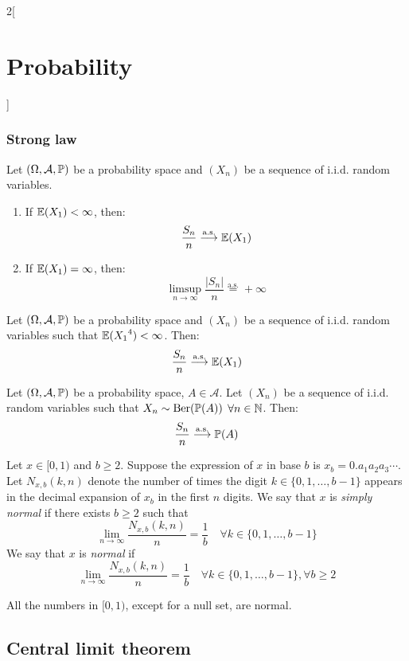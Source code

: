 \documentclass[../../../main.tex]{subfiles}
\begin{document}
\begin{multicols}{2}[\section{Probability}]
    \subsubsection{Strong law}
    \begin{theorem}
        Let $(\Omega,\mathcal{A},\mathbb{P})$ be a probability space and $(X_n)$ be a sequence of i.i.d. random variables.
        \begin{enumerate}
            \item If $\mathbb{E}(X_1)<\infty$, then: $$\frac{S_n}{n}\overset{\text{a.s.}}{\longrightarrow}\mathbb{E}(X_1)$$
            \item If $\mathbb{E}(X_1)=\infty$, then: $$\limsup_{n\to\infty}\frac{|S_n|}{n}\overset{\text{a.s.}}{=}+\infty$$
        \end{enumerate}
    \end{theorem}
    \begin{theorem}
        Let $(\Omega,\mathcal{A},\mathbb{P})$ be a probability space and $(X_n)$ be a sequence of i.i.d. random variables such that $\mathbb{E}({X_1}^4)<\infty$. Then: $$\frac{S_n}{n}\overset{\text{a.s.}}{\longrightarrow}\mathbb{E}(X_1)$$
    \end{theorem}
    \begin{corollary}
        Let $(\Omega,\mathcal{A},\mathbb{P})$ be a probability space, $A\in\mathcal{A}$. Let $(X_n)$ be a sequence of i.i.d. random variables such that $X_n\sim\text{Ber}(\mathbb{P}(A))$ $\forall n\in\mathbb{N}$. Then: $$\frac{S_n}{n}\overset{\text{a.s.}}{\longrightarrow}\mathbb{P}(A)$$
    \end{corollary}
    \begin{definition}
        Let $x\in[0,1)$ and $b\geq 2$. Suppose the expression of $x$ in base $b$ is $x_b=0.a_1a_2a_3\cdots$. Let $N_{x,b}(k,n)$ denote the number of times the digit $k\in\{0,1,\ldots,b-1\}$ appears in the decimal expansion of $x_b$ in the first $n$ digits. We say that $x$ is \emph{simply normal} if there exists $b\geq 2$ such that $$\lim_{n\to\infty}\frac{N_{x,b}(k,n)}{n}=\frac{1}{b}\quad\forall k\in\{0,1,\ldots,b-1\}$$
        We say that $x$ is \emph{normal} if $$\lim_{n\to\infty}\frac{N_{x,b}(k,n)}{n}=\frac{1}{b}\quad\forall k\in\{0,1,\ldots,b-1\}, \forall b\geq 2$$
    \end{definition}
    \begin{theorem}
        All the numbers in $[0,1)$, except for a null set, are normal.
    \end{theorem}
    \subsection{Central limit theorem}

\end{multicols}
\end{document}
